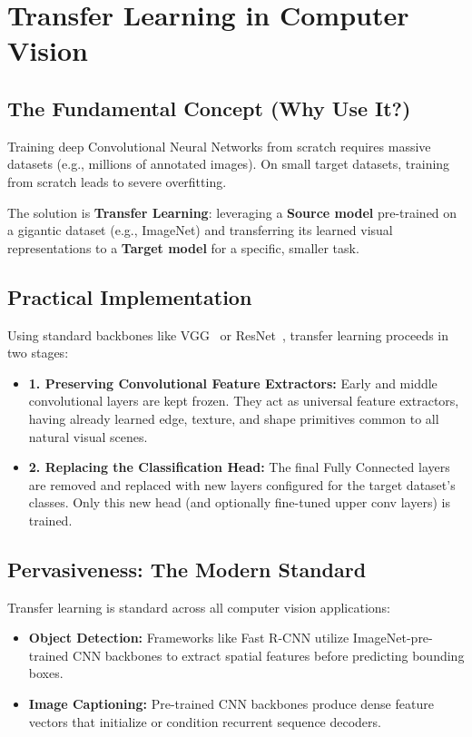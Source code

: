 \section{Transfer Learning in Computer Vision}

\subsection{The Fundamental Concept (Why Use It?)}
Training deep Convolutional Neural Networks from scratch requires massive datasets (e.g., millions of annotated images). On small target datasets, training from scratch leads to severe overfitting.

The solution is \textbf{Transfer Learning}: leveraging a \textbf{Source model} pre-trained on a gigantic dataset (e.g., ImageNet) and transferring its learned visual representations to a \textbf{Target model} for a specific, smaller task.

\subsection{Practical Implementation}
Using standard backbones like VGG~\cite{simonyan2014very} or ResNet~\cite{he2016deep}, transfer learning proceeds in two stages:
\begin{itemize}[leftmargin=*]
    \item \textbf{1. Preserving Convolutional Feature Extractors:} Early and middle convolutional layers are kept frozen. They act as universal feature extractors, having already learned edge, texture, and shape primitives common to all natural visual scenes.
    \item \textbf{2. Replacing the Classification Head:} The final Fully Connected layers are removed and replaced with new layers configured for the target dataset's classes. Only this new head (and optionally fine-tuned upper conv layers) is trained.
\end{itemize}

\subsection{Pervasiveness: The Modern Standard}
Transfer learning is standard across all computer vision applications:
\begin{itemize}[leftmargin=*]
    \item \textbf{Object Detection:} Frameworks like Fast R-CNN utilize ImageNet-pre-trained CNN backbones to extract spatial features before predicting bounding boxes.
    \item \textbf{Image Captioning:} Pre-trained CNN backbones produce dense feature vectors that initialize or condition recurrent sequence decoders.
\end{itemize}

